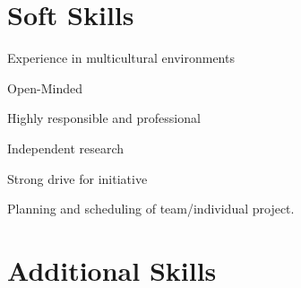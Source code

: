 \section*{Soft Skills}

{
Experience in multicultural environments

Open-Minded

Highly responsible and professional
}
{
Independent research

Strong drive for initiative

Planning and scheduling of team/individual project.
}

\section*{Additional Skills}



